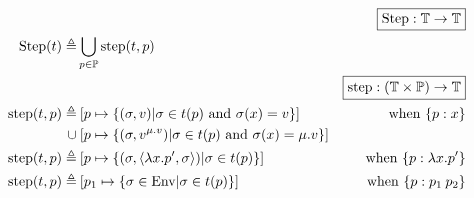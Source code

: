 \documentclass{article}
\begin{document}
\begin{align*}
	                           &                                                                                                                                                                                                                                                   & \fbox{$\Step:\mathbb{T}\rightarrow\mathbb{T}$}                   \\
	\Step(\ptree)   \triangleq & \bigcup_{p\in\mathbb{P}}\step(\ptree,p)                                                                                                                                                                                                                                                                              \\
	                           &                                                                                                                                                                                                                                                   & \fbox{$\step:(\mathbb{T}\times\mathbb{P})\rightarrow\mathbb{T}$} \\
	\step(\ptree,p) \triangleq & \: [p\mapsto\{(\ctx,v)|\ctx\in\ptree(p)\text{ and }\ctx(x)=v\}]                                                                                                                                                                                   & \text{when }\plabel{p}{x}                                        \\
	\cup                       & \: [p\mapsto\{(\ctx,\openloc{\mu.v}{v})|\ctx\in \ptree(p)\text{ and }\ctx(x)=\mu.v\}]                                                                                                                                                                                                                                \\
	\step(\ptree,p) \triangleq & \: [p\mapsto\{(\ctx,\langle\lambda x.p',\ctx\rangle)|\ctx\in \ptree(p)\}]                                                                                                                                                                         & \text{when }\plabel{p}{\lambda x.p'}                             \\
	\step(\ptree,p) \triangleq & \: [p_1\mapsto\{\ctx\in\Ctx|\ctx\in \ptree(p)\}]                                                                                                                                                                                                  & \text{when }\plabel{p}{p_1\:p_2}                                 \\

\end{align*}
\end{document}
